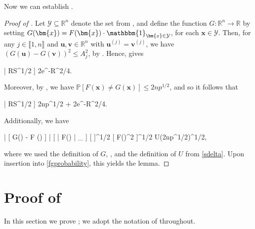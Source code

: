 \documentclass{amsart}
\numberwithin{equation}{section}
\theoremstyle{remark}
\theoremstyle{definition}
\begin{document}
	Now we can establish .
	
	\begin{proof}[Proof of ]
		
		Let $\mathcal{Y} \subseteq \mathbb{R}^n$ denote the set from , and define the function $G: \mathbb{R}^n \rightarrow \mathbb{R}$ by setting $G(\bm{x}) = F(\bm{x}) \cdot \mathbbm{1}_{\bm{x} \in \mathcal{Y}}$, for each $\bm{x} \in \mathcal{Y}$. Then, for any $j \in \llbracket 1, n \rrbracket$ and $\bm{u}, \bm{v} \in \mathbb{R}^n$ with $\bm{u}^{(j)} = \bm{v}^{(j)}$, we have  $( G(\bm{u}) - G(\bm{v}) )^2 \le A_j^2$, by . Hence, \cite[Theorem 12]{CI} gives 
		\begin{flalign*}
			 \big[ \big| G(\bm{x}) - \mathbb{E} [ G(\bm{x}) ] \big| \ge RS^{1/2} \big] \le 2e^{-R^2/4}.
		\end{flalign*}
		
		\noindent Moreover, by , we have $\mathbb{P} [ F(\bm{x}) \ne G(\bm{x}) ] \le 2np^{1/2}$, and so it follows that 
		\begin{flalign}
			\label{fgprobability}
			 \big[ \big| F(\bm{x}) - \mathbb{E} [ G(\bm{x}) ] \big| \ge RS^{1/2} \big] \le 2np^{1/2} + 2e^{-R^2/4}.
		\end{flalign}
		
		\noindent Additionally, we have 
		\begin{flalign*}
			\big|  [ G(\bm{x}) - F () ] \big| \le {} [ | F() | \cdot {}_{ \notin {}} ] \le {} [ \notin {}]^{1/2} \cdot {} [ F()^2 ]^{1/2} \le U(2np^{1/2})^{1/2},
		\end{flalign*}
		
		\noindent where we used the definition of $G$, , and the definition of $U$ from \eqref{sdelta}. Upon insertion into \eqref{fgprobability}, this yields the lemma.	
	\end{proof}
	
	
		
	
	
	
	
	\section{Proof of }
	
	\label{ProofLambdaH} 
	
	In this section we prove ; we adopt the notation of  throughout.
	
\end{document}
